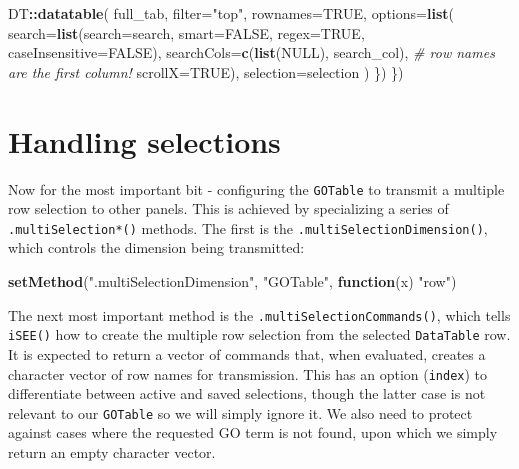 \documentclass[]{book}
\newenvironment{Shaded}{\begin{snugshade}}{\end{snugshade}}
\newcommand{\KeywordTok}[1]{\textcolor[rgb]{0.13,0.29,0.53}{\textbf{#1}}}
\newcommand{\DataTypeTok}[1]{\textcolor[rgb]{0.13,0.29,0.53}{#1}}
\newcommand{\StringTok}[1]{\textcolor[rgb]{0.31,0.60,0.02}{#1}}
\newcommand{\CommentTok}[1]{\textcolor[rgb]{0.56,0.35,0.01}{\textit{#1}}}
\newcommand{\OtherTok}[1]{\textcolor[rgb]{0.56,0.35,0.01}{#1}}
\newcommand{\ControlFlowTok}[1]{\textcolor[rgb]{0.13,0.29,0.53}{\textbf{#1}}}
\newcommand{\OperatorTok}[1]{\textcolor[rgb]{0.81,0.36,0.00}{\textbf{#1}}}
\newcommand{\NormalTok}[1]{#1}
\begin{document}
\begin{Shaded}
\begin{Highlighting}[]
\NormalTok{        DT}\OperatorTok{::}\KeywordTok{datatable}\NormalTok{(}
\NormalTok{            full_tab, }\DataTypeTok{filter=}\StringTok{"top"}\NormalTok{, }\DataTypeTok{rownames=}\OtherTok{TRUE}\NormalTok{,}
            \DataTypeTok{options=}\KeywordTok{list}\NormalTok{(}
                \DataTypeTok{search=}\KeywordTok{list}\NormalTok{(}\DataTypeTok{search=}\NormalTok{search, }\DataTypeTok{smart=}\OtherTok{FALSE}\NormalTok{, }\DataTypeTok{regex=}\OtherTok{TRUE}\NormalTok{, }\DataTypeTok{caseInsensitive=}\OtherTok{FALSE}\NormalTok{),}
                \DataTypeTok{searchCols=}\KeywordTok{c}\NormalTok{(}\KeywordTok{list}\NormalTok{(}\OtherTok{NULL}\NormalTok{), search_col), }\CommentTok{# row names are the first column!}
                \DataTypeTok{scrollX=}\OtherTok{TRUE}\NormalTok{),}
            \DataTypeTok{selection=}\NormalTok{selection}
\NormalTok{        )}
\NormalTok{    \})}
\NormalTok{\})}
\end{Highlighting}
\end{Shaded}

\section{Handling selections}\label{handling-selections}

Now for the most important bit - configuring the \texttt{GOTable} to
transmit a multiple row selection to other panels. This is achieved by
specializing a series of \texttt{.multiSelection*()} methods. The first
is the \texttt{.multiSelectionDimension()}, which controls the dimension
being transmitted:

\begin{Shaded}
\begin{Highlighting}[]
\KeywordTok{setMethod}\NormalTok{(}\StringTok{".multiSelectionDimension"}\NormalTok{, }\StringTok{"GOTable"}\NormalTok{, }\ControlFlowTok{function}\NormalTok{(x) }\StringTok{"row"}\NormalTok{)}
\end{Highlighting}
\end{Shaded}

The next most important method is the
\texttt{.multiSelectionCommands()}, which tells \texttt{iSEE()} how to
create the multiple row selection from the selected \texttt{DataTable}
row. It is expected to return a vector of commands that, when evaluated,
creates a character vector of row names for transmission. This has an
option (\texttt{index}) to differentiate between active and saved
selections, though the latter case is not relevant to our
\texttt{GOTable} so we will simply ignore it. We also need to protect
against cases where the requested GO term is not found, upon which we
simply return an empty character vector.
\end{document}
